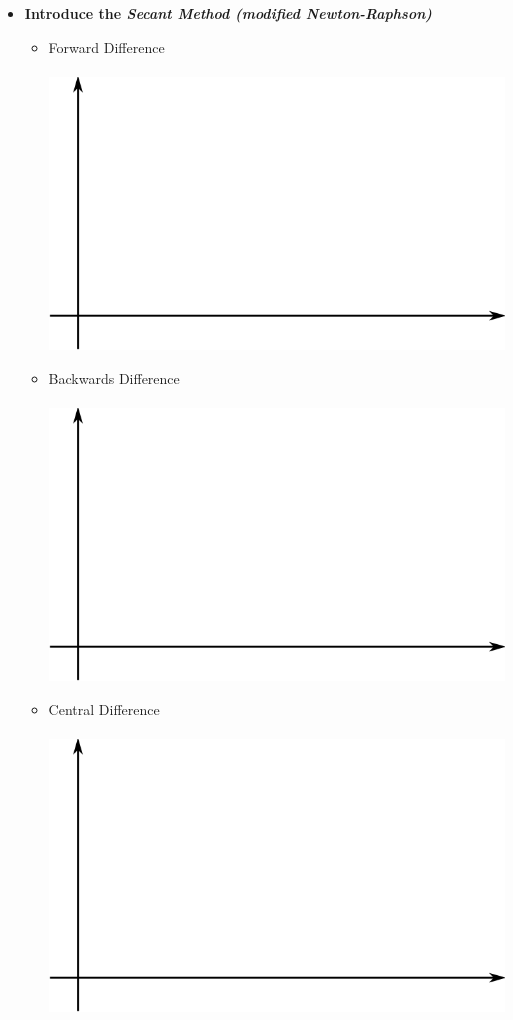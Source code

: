 \documentclass[11pt]{article}
\begin{document}
\begin{itemize}
\newpage
	\item \textbf{ \LARGE Introduce the {\it Secant Method (modified Newton-Raphson)}}
\begin{itemize}	
	\item \LARGE{Forward Difference}\\\\
	\includegraphics[scale=.35]{lecture4_fig1.png}\\
	\item \LARGE{Backwards Difference}\\\\
	\includegraphics[scale=.35]{lecture4_fig1.png}\\
	\item \LARGE{Central Difference}\\\\
	\includegraphics[scale=.35]{lecture4_fig1.png}

\end{itemize}
\end{itemize}
\end{document}
